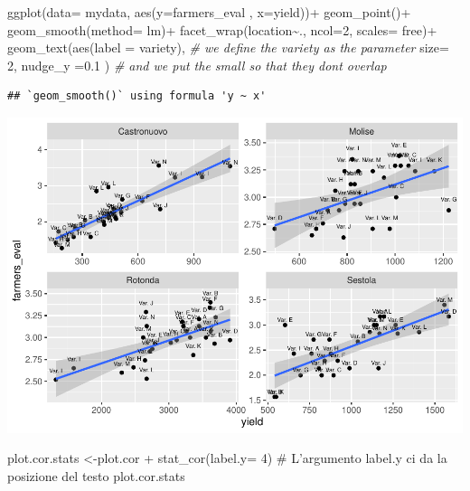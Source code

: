 \documentclass[
]{book}
\newenvironment{Shaded}{\begin{snugshade}}{\end{snugshade}}
\newcommand{\AttributeTok}[1]{\textcolor[rgb]{0.77,0.63,0.00}{#1}}
\newcommand{\CommentTok}[1]{\textcolor[rgb]{0.56,0.35,0.01}{\textit{#1}}}
\newcommand{\DecValTok}[1]{\textcolor[rgb]{0.00,0.00,0.81}{#1}}
\newcommand{\FloatTok}[1]{\textcolor[rgb]{0.00,0.00,0.81}{#1}}
\newcommand{\FunctionTok}[1]{\textcolor[rgb]{0.00,0.00,0.00}{#1}}
\newcommand{\NormalTok}[1]{#1}
\newcommand{\SpecialCharTok}[1]{\textcolor[rgb]{0.00,0.00,0.00}{#1}}
\newcommand{\StringTok}[1]{\textcolor[rgb]{0.31,0.60,0.02}{#1}}
\begin{document}
\begin{Shaded}
\begin{Highlighting}[]
\FunctionTok{ggplot}\NormalTok{(}\AttributeTok{data=}\NormalTok{ mydata, }\FunctionTok{aes}\NormalTok{(}\AttributeTok{y=}\NormalTok{farmers\_eval ,  }\AttributeTok{x=}\NormalTok{yield))}\SpecialCharTok{+}
                   \FunctionTok{geom\_point}\NormalTok{()}\SpecialCharTok{+}
                   \FunctionTok{geom\_smooth}\NormalTok{(}\AttributeTok{method=}\NormalTok{ lm)}\SpecialCharTok{+}           
                   \FunctionTok{facet\_wrap}\NormalTok{(location}\SpecialCharTok{\textasciitilde{}}\NormalTok{., }\AttributeTok{ncol=}\DecValTok{2}\NormalTok{, }\AttributeTok{scales=} \StringTok{\textquotesingle{}free\textquotesingle{}}\NormalTok{)}\SpecialCharTok{+}
                   \FunctionTok{geom\_text}\NormalTok{(}\FunctionTok{aes}\NormalTok{(}\AttributeTok{label =}\NormalTok{ variety),    }\CommentTok{\# we define the variety as the parameter}
                              \AttributeTok{size=} \DecValTok{2}\NormalTok{,}
                             \AttributeTok{nudge\_y =}\FloatTok{0.1}\NormalTok{ )                  }\CommentTok{\# and we put the small so that they don\textquotesingle{}t overlap }
\end{Highlighting}
\end{Shaded}

\begin{verbatim}
## `geom_smooth()` using formula 'y ~ x'
\end{verbatim}

\includegraphics{PPB-Toolkit-for-R-and-R-Studio_files/figure-latex/unnamed-chunk-65-1.pdf}

plot.cor.stats \textless-plot.cor + stat\_cor(label.y= 4) \# L'argumento label.y ci da la posizione del testo
plot.cor.stats
\end{document}

